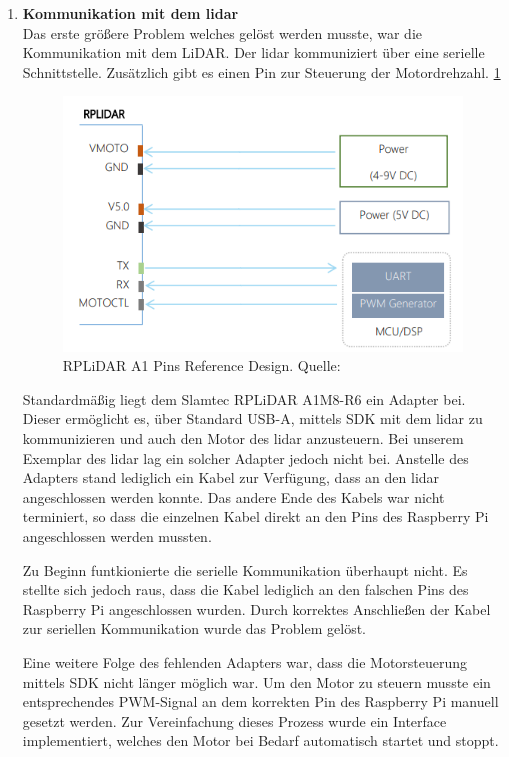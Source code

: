 \begin{enumerate}[leftmargin=*]
    \item \textbf{Kommunikation mit dem \ac{lidar}} \\
    Das erste größere Problem welches gelöst werden musste, war die Kommunikation mit dem LiDAR.
    Der \ac{lidar} kommuniziert über eine serielle Schnittstelle.
    Zusätzlich gibt es einen Pin zur Steuerung der Motordrehzahl. \ref{fig:lidar_pins}

    \begin{figure}[H]
        \centering
        \includegraphics[width=12cm]{graphics/lidar_pin_layout.png}
        \caption{RPLiDAR A1 Pins Reference Design. Quelle: \cite[p. 12]{Slamtec2023} }
        \label{fig:lidar_pins}
    \end{figure}

    Standardmäßig liegt dem Slamtec RPLiDAR A1M8-R6 ein Adapter bei.
    Dieser ermöglicht es, über Standard USB-A, mittels SDK mit dem \ac{lidar} zu kommunizieren und auch den Motor des \ac{lidar} anzusteuern.
    Bei unserem Exemplar des \ac{lidar} lag ein solcher Adapter jedoch nicht bei.
    Anstelle des Adapters stand lediglich ein Kabel zur Verfügung, dass an den \ac{lidar} angeschlossen werden konnte.
    Das andere Ende des Kabels war nicht terminiert, so dass die einzelnen Kabel direkt an den Pins des Raspberry Pi angeschlossen werden mussten.

    Zu Beginn funtkionierte die serielle Kommunikation überhaupt nicht.
    Es stellte sich jedoch raus, dass die Kabel lediglich an den falschen Pins des Raspberry Pi angeschlossen wurden.
    Durch korrektes Anschließen der Kabel zur seriellen Kommunikation wurde das Problem gelöst.

    Eine weitere Folge des fehlenden Adapters war, dass die Motorsteuerung mittels SDK nicht länger möglich war.
    Um den Motor zu steuern musste ein entsprechendes PWM-Signal an dem korrekten Pin des Raspberry Pi manuell gesetzt werden.
    Zur Vereinfachung dieses Prozess wurde ein Interface implementiert, welches den Motor bei Bedarf automatisch startet und stoppt.


\end{enumerate}
